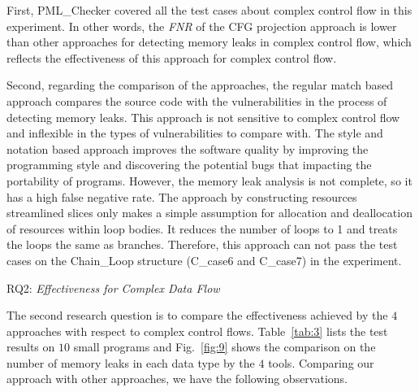 
First, PML\_Checker covered all the test cases about complex control flow in this experiment. In other words, the \textit{FNR} of the CFG projection approach is lower than other approaches for detecting memory leaks in complex control flow, which reflects the effectiveness of this approach for complex control flow.

Second, regarding the comparison of the approaches, the regular match based approach compares the source code with the vulnerabilities in the process of detecting memory leaks. This approach is not sensitive to complex control flow and inflexible in the types of vulnerabilities to compare with. The style and notation based approach improves the software quality by improving the programming style and discovering the potential bugs that impacting the portability of programs. However, the memory leak analysis is not complete, so it has a high false negative rate. The approach by constructing resources streamlined slices only makes a simple assumption for allocation and deallocation of resources within loop bodies. It reduces the number of loops to 1 and treats the loops the same as branches. Therefore, this approach can not pass the test cases on the Chain\_Loop structure (C\_case6 and C\_case7) in the experiment.

\noindent RQ2: \textit{Effectiveness for Complex Data Flow}

The second research question is to compare the effectiveness achieved by the $4$ approaches with respect to complex control flows. Table~\ref{tab:3} lists the test results on $10$ small programs and Fig.~\ref{fig:9} shows the comparison on the number of  memory leaks in each data type by the $4$ tools. Comparing our approach with other approaches, we have the following observations.

